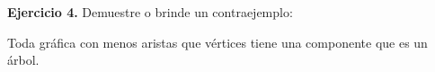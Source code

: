 \textbf{Ejercicio 4.} Demuestre o brinde un contraejemplo:

Toda gráfica con menos aristas que vértices tiene una componente 
que es un árbol. 